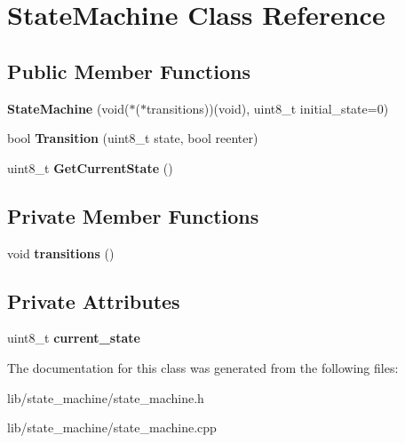 \hypertarget{class_state_machine}{}\section{State\+Machine Class Reference}
\label{class_state_machine}
\subsection*{Public Member Functions}
\begin{DoxyCompactItemize}
\item 
{\bfseries State\+Machine} (void($\ast$($\ast$transitions))(void), uint8\+\_\+t initial\+\_\+state=0)\hypertarget{class_state_machine_a93dc36ab30f26854dcf2d8556a487d1e}{}\label{class_state_machine_a93dc36ab30f26854dcf2d8556a487d1e}

\item 
bool {\bfseries Transition} (uint8\+\_\+t state, bool reenter)\hypertarget{class_state_machine_a1597799edc5a89006f164e52fd72d02b}{}\label{class_state_machine_a1597799edc5a89006f164e52fd72d02b}

\item 
uint8\+\_\+t {\bfseries Get\+Current\+State} ()\hypertarget{class_state_machine_a62fd24666d16a2425c8397ce2d326dae}{}\label{class_state_machine_a62fd24666d16a2425c8397ce2d326dae}

\end{DoxyCompactItemize}
\subsection*{Private Member Functions}
\begin{DoxyCompactItemize}
\item 
void {\bfseries transitions} ()\hypertarget{class_state_machine_ad15834b0fa8f6e036f74c9b65aadb7be}{}\label{class_state_machine_ad15834b0fa8f6e036f74c9b65aadb7be}

\end{DoxyCompactItemize}
\subsection*{Private Attributes}
\begin{DoxyCompactItemize}
\item 
uint8\+\_\+t {\bfseries current\+\_\+state}\hypertarget{class_state_machine_abdcd9426d9a2ec9e2d703c74cd3299df}{}\label{class_state_machine_abdcd9426d9a2ec9e2d703c74cd3299df}

\end{DoxyCompactItemize}


The documentation for this class was generated from the following files\+:\begin{DoxyCompactItemize}
\item 
lib/state\+\_\+machine/state\+\_\+machine.\+h\item 
lib/state\+\_\+machine/state\+\_\+machine.\+cpp\end{DoxyCompactItemize}
